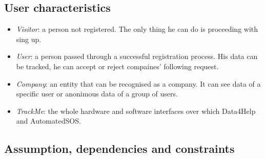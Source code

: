 \documentclass{article}
\begin{document}
\subsection{User characteristics}
\begin{itemize}
\item \emph{Visitor}: a person not registered. The only thing he can do is proceeding with sing up.
\item \emph{User}: a person passed through a successful registration process. His data can be tracked, he can accept or reject compaines' following request.
 \item \emph{Company}: an entity that can be recognised as a company. It can see data of a specific user or anonimous data of a group of users. 
 \item \emph{TrackMe}: the whole hardware and software interfaces over which Data4Help and AutomatedSOS.
\end{itemize}
\subsection{Assumption, dependencies and constraints}
\end{document}
